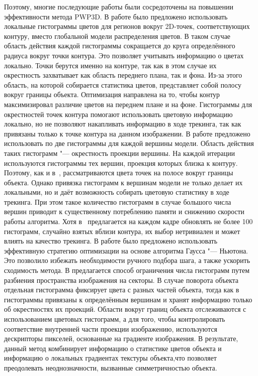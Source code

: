 Поэтому, многие последующие работы были сосредоточены на повышении
эффективности
метода PWP3D.
В работе \cite{Hexner2016} было предложено использовать локальные гистограммы
цветов для регионов вокруг 2D-точек, соответствующих контуру, вместо
глобальной модели распределения цветов.
В таком случае область действия каждой гистограммы сокращается до круга
определённого радиуса вокруг точки контура.
Это позволяет учитывать информацию о цветах локально.
Точки берутся именно на контуре, так как в этом случае их окрестность
захватывает
как область переднего плана, так и фона.
Из-за этого область, на которой собирается статистика цветов, представляет
собой полосу вокруг границы объекта.
Оптимизация направлена на то, чтобы контур максимизировал
различие цветов на переднем плане и на фоне.
Гистограммы для окрестностей точек контура помогают использовать цветовую
информацию локально, но не позволяют накапливать информацию в ходе трекинга,
так как привязаны только к точке контура на данном изображении.
В работе \cite{Tjaden2017} предложено использовать по две гистограммы для
каждой вершины модели.
Область действия таких гистограмм "--- окрестность проекции вершины.
На каждой итерации используются гистограммы тех вершин, проекция которых
близка к контуру.
Поэтому, как и в~\cite{Hexner2016}, рассматриваются цвета точек на полосе
вокруг границы объекта.
Однако привязка гистограмм к вершинам модели не только делает их локальными,
но и даёт возможность собирать цветовую статистику в ходе трекинга.
При этом такое количество гистограмм в случае большого числа вершин приводит к
существенному потреблению памяти и снижению скорости работы алгоритма.
Хотя в~\cite{Tjaden2017} предлагается на каждом кадре обновлять не более 100
гистограмм, случайно взятых вблизи контура, их выбор нетривиален и может влиять
на качество трекинга.
 В работе \cite{Tjaden2018} было предложено использовать
эффективную стратегию оптимизации на основе алгоритма Гаусса "--- Ньютона. Это
позволило избежать необходимости ручного
подбора шага, а также ускорить сходимость метода. 
В \cite{Zhong2018} предлагается способ ограничения числа гистограмм
путем разбиения пространства изображения на секторы. В случае поворота объекта
отдельная гистограмма фиксирует цвета с разных частей
объекта, тогда как в \cite{Tjaden2017} гистограммы привязаны к определённым
вершинам и хранят информацию только об окрестностях их проекций.
Области вокруг границ объекта отслеживаются с использованием цветовых
гистограмм, а для того, чтобы контролировать соответствие внутренней части
проекции изображению, используются дескрипторы пикселей, основанные на
градиенте изображения. В результате, данный метод комбинирует информацию о
статистике цветов объекта и информацию о локальных градиентах текстуры
объекта,что позволяет преодолевать неоднозначности, вызванные симметричностью
объекта.


